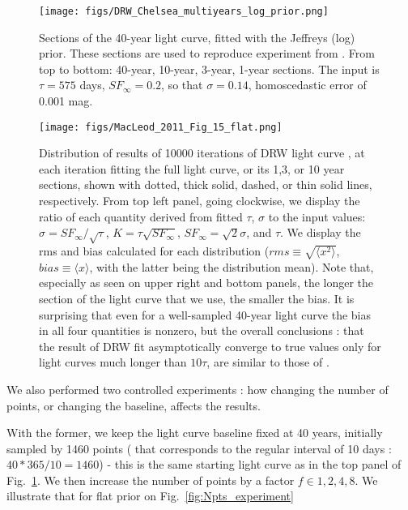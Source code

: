 \documentclass[fleqn,usenatbib]{mnras}  %
\begin{document}
\begin{figure}
\texttt{[image: figs/DRW\_Chelsea\_multiyears\_log\_prior.png]}
\caption{Sections of the 40-year light curve, fitted with the Jeffreys (log) prior. These sections are used to reproduce experiment from \citep{macleod2011}.  From top to bottom: 40-year, 10-year, 3-year, 1-year sections. The input is $\tau = 575$ days, $SF_{\infty} = 0.2$, so that $\sigma = 0.14$, homoscedastic error of 0.001 mag.  }
\label{fig:lc_sections}
\end{figure}



\begin{figure}
\texttt{[image: figs/MacLeod\_2011\_Fig\_15\_flat.png]}
\caption{Distribution of results of 10000 iterations of DRW light curve , at each iteration fitting the full light curve, or its 1,3, or 10 year sections, shown with dotted, thick solid,  dashed, or thin solid lines, respectively. From top left panel, going clockwise, we display the ratio of each quantity derived from fitted $\tau$, $\sigma$ to the input values:  $\hat{\sigma}  = SF_{\infty}  / \sqrt{\tau}$,  $K = \tau \sqrt{SF_{\infty}}$, $SF_{\infty} = \sqrt{2} \sigma$, and $\tau$. We display the rms and bias calculated for each distribution ($rms \equiv  \sqrt{\langle x^{2}\rangle}$, $bias \equiv \langle x \rangle $, with the latter being the distribution mean). Note that, especially as seen on upper right and bottom panels, the longer the section of the light curve that we use, the smaller the bias. It is surprising that even for a well-sampled 40-year light curve the bias in all four quantities is nonzero, but the overall conclusions : that the result of DRW fit asymptotically converge to true values only for light curves much longer than $10 \tau$,  are similar to those of \citep{macleod2011}. }
\label{fig:macleod11_15}
\end{figure}



We also performed two controlled experiments : how changing the number of points, or changing the baseline, affects the results.  

With the former, we keep the light curve  baseline fixed at 40 years,  initially sampled by 1460 points ( that corresponds to the regular interval of 10 days : $40 * 365 / 10  = 1460$) - this is the same starting light curve as in the top panel of Fig.~\ref{fig:lc_sections}. 
We then increase the number of points by a factor $f \in {1,2,4,8}$. We illustrate that for flat prior on Fig.~\ref{fig:Npts_experiment}
\end{document}
